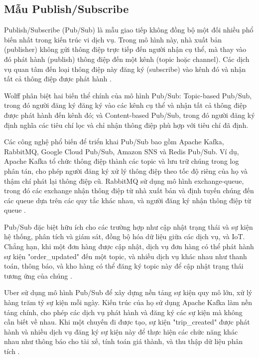\subsection{Mẫu Publish/Subscribe}
Publish/Subscribe (Pub/Sub) là mẫu giao tiếp không đồng bộ một đối nhiều phổ biến nhất trong kiến trúc vi dịch vụ. Trong mô hình này, nhà xuất bản (publisher) không gửi thông điệp trực tiếp đến người nhận cụ thể, mà thay vào đó phát hành (publish) thông điệp đến một kênh (topic hoặc channel). Các dịch vụ quan tâm đến loại thông điệp này đăng ký (subscribe) vào kênh đó và nhận tất cả thông điệp được phát hành \cite{hohpe2004}.

Wolff \cite{wolff2016} phân biệt hai biến thể chính của mô hình Pub/Sub: Topic-based Pub/Sub, trong đó người đăng ký đăng ký vào các kênh cụ thể và nhận tất cả thông điệp được phát hành đến kênh đó; và Content-based Pub/Sub, trong đó người đăng ký định nghĩa các tiêu chí lọc và chỉ nhận thông điệp phù hợp với tiêu chí đã định.

Các công nghệ phổ biến để triển khai Pub/Sub bao gồm Apache Kafka, RabbitMQ, Google Cloud Pub/Sub, Amazon SNS và Redis Pub/Sub. Ví dụ, Apache Kafka tổ chức thông điệp thành các topic và lưu trữ chúng trong log phân tán, cho phép người đăng ký xử lý thông điệp theo tốc độ riêng của họ và thậm chí phát lại thông điệp cũ. RabbitMQ sử dụng mô hình exchange-queue, trong đó các exchange nhận thông điệp từ nhà xuất bản và định tuyến chúng đến các queue dựa trên các quy tắc khác nhau, và người đăng ký nhận thông điệp từ queue \cite{jun2018}.

Pub/Sub đặc biệt hữu ích cho các trường hợp như cập nhật trạng thái và sự kiện hệ thống, phân tích và giám sát, đồng bộ hóa dữ liệu giữa các dịch vụ, và IoT. Chẳng hạn, khi một đơn hàng được cập nhật, dịch vụ đơn hàng có thể phát hành sự kiện "order\_updated" đến một topic, và nhiều dịch vụ khác nhau như thanh toán, thông báo, và kho hàng có thể đăng ký topic này để cập nhật trạng thái tương ứng của chúng \cite{newman2015}.

Uber sử dụng mô hình Pub/Sub để xây dựng nền tảng sự kiện quy mô lớn, xử lý hàng trăm tỷ sự kiện mỗi ngày. Kiến trúc của họ sử dụng Apache Kafka làm nền tảng chính, cho phép các dịch vụ phát hành và đăng ký các sự kiện mà không cần biết về nhau. Khi một chuyến đi được tạo, sự kiện "trip\_created" được phát hành và nhiều dịch vụ đăng ký sự kiện này để thực hiện các chức năng khác nhau như thông báo cho tài xế, tính toán giá thành, và thu thập dữ liệu phân tích \cite{beyer2018}.

